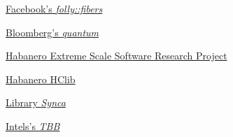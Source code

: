 \begin{thebibliography}{99}
        \href{https://github.com/facebook/folly/tree/master/folly/fibers}
        {Facebook's \emph{folly::fibers}}

        \href{https://github.com/bloomberg/quantum}
        {Bloomberg's \emph{quantum}}

    \href{https://wiki.rice.edu/confluence/display/HABANERO/Habanero+Extreme+Scale+Software+Research+Project}
        {Habanero Extreme Scale Software Research Project}

    \href{https://github.com/habanero-rice/hclib}
        {Habanero HClib}

        \href{https://github.com/gridem/Synca}
        {Library \emph{Synca}}

        \href{https://github.com/intel/tbb}
        {Intels's \emph{TBB}}

\end{thebibliography}
